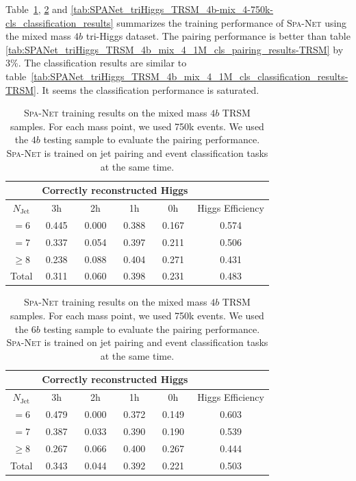\documentclass[12pt]{article}
\begin{document}
    Table~\ref{tab:SPANet_triHiggs_TRSM_4b-mix_4-750k-cls_4b_pairing_results}, \ref{tab:SPANet_triHiggs_TRSM_4b-mix_4-750k-cls_6b_pairing_results} and \ref{tab:SPANet_triHiggs_TRSM_4b-mix_4-750k-cls_classification_results} summarizes the training performance of \textsc{Spa-Net} using the mixed mass $4b$ tri-Higgs dataset. The pairing performance is better than table \ref{tab:SPANet_triHiggs_TRSM_4b_mix_4_1M_cls_pairing_results-TRSM} by 3\%. The classification results are similar to table~\ref{tab:SPANet_triHiggs_TRSM_4b_mix_4_1M_cls_classification_results-TRSM}. It seems the classification performance is saturated.
    \begin{table}[htpb]
        \centering
        \caption{\textsc{Spa-Net} training results on the mixed mass $4b$ TRSM samples. For each mass point, we used 750k events. We used the $4b$ testing sample to evaluate the pairing performance. \textsc{Spa-Net} is trained on jet pairing and event classification tasks at the same time.}
        \label{tab:SPANet_triHiggs_TRSM_4b-mix_4-750k-cls_4b_pairing_results}
        \begin{tabular}{c|cccc|c}
                       & \multicolumn{4}{c|}{Correctly reconstructed Higgs} &                  \\ \hline
        $N_\text{Jet}$ & 3h          & 2h         & 1h         & 0h         & Higgs Efficiency \\ \hline
        $=6$           & 0.445 & 0.000 & 0.388 & 0.167 & 0.574            \\
        $=7$           & 0.337 & 0.054 & 0.397 & 0.211 & 0.506            \\
        $\ge 8$        & 0.238 & 0.088 & 0.404 & 0.271 & 0.431            \\ \hline
        Total          & 0.311 & 0.060 & 0.398 & 0.231 & 0.483
        \end{tabular}
    \end{table}
    \begin{table}[htpb]
        \centering
        \caption{\textsc{Spa-Net} training results on the mixed mass $4b$ TRSM samples. For each mass point, we used 750k events. We used the $6b$ testing sample to evaluate the pairing performance. \textsc{Spa-Net} is trained on jet pairing and event classification tasks at the same time.}
        \label{tab:SPANet_triHiggs_TRSM_4b-mix_4-750k-cls_6b_pairing_results}
        \begin{tabular}{c|cccc|c}
                       & \multicolumn{4}{c|}{Correctly reconstructed Higgs} &                  \\ \hline
        $N_\text{Jet}$ & 3h          & 2h         & 1h         & 0h         & Higgs Efficiency \\ \hline
        $=6$           & 0.479 & 0.000 & 0.372 & 0.149 & 0.603             \\
        $=7$           & 0.387 & 0.033 & 0.390 & 0.190 & 0.539             \\
        $\ge 8$        & 0.267 & 0.066 & 0.400 & 0.267 & 0.444             \\ \hline
        Total          & 0.343 & 0.044 & 0.392 & 0.221 & 0.503 
        \end{tabular}
    \end{table}
\end{document}
